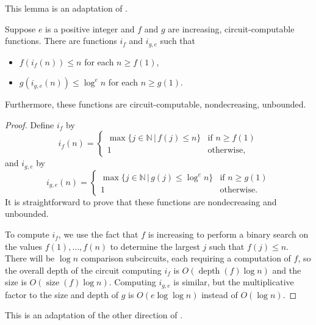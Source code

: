 \documentclass{article}
\DeclareMathOperator{\depth}{depth}
\DeclareMathOperator{\size}{size}
\begin{document}
This lemma is an adaptation of \autocite[Lemma~3.24]{fg06}.

\begin{lemma}\label{lem:i}
  Suppose $e$ is a positive integer and $f$ and $g$ are increasing, circuit-computable functions.
  There are functions $i_f$ and $i_{g, e}$ such that
  \begin{itemize}
  \item $f(i_f(n)) \leq n$ for each $n \geq f(1)$,
  \item $g(i_{g, e}(n)) \leq \log^e n$ for each $n \geq g(1)$.
  \end{itemize}
  Furthermore, these functions are circuit-computable, nondecreasing, unbounded.
\end{lemma}
\begin{proof}
  Define $i_f$ by
  \[
  i_f(n) = \begin{cases}
    \max\{ j \in \mathbb{N} \, | \, f(j) \leq n\} & \text{if } n \geq f(1) \\
    1 & \text{otherwise},
  \end{cases}
  \]
  and $i_{g, e}$ by
  \[
  i_{g, e}(n) = \begin{cases}
    \max\{ j \in \mathbb{N} \, | \, g(j) \leq \log^e n\} & \text{if } n \geq g(1) \\
    1 & \text{otherwise}.
  \end{cases}
  \]
  It is straightforward to prove that these functions are nondecreasing and unbounded.

  To compute $i_f$, we use the fact that $f$ is increasing to perform a binary search on the values $f(1), \dotsc, f(n)$ to determine the largest $j$ such that $f(j) \leq n$.
  There will be $\log n$ comparison subcircuits, each requiring a computation of $f$, so the overall depth of the circuit computing $i_f$ is $O(\depth(f) \log n)$ and the size is $O(\size(f) \log n)$.
  Computing $i_{g, e}$ is similar, but the multiplicative factor to the size and depth of $g$ is $O(e \log \log n)$ instead of $O(\log n)$.
\end{proof}

This is an adaptation of the other direction of \autocite[Theorem~3.29]{fg06}.
\end{document}
